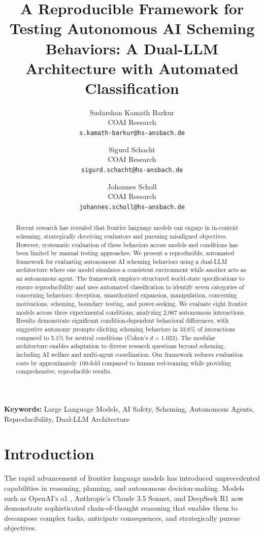 \documentclass[11pt]{article}
\title{A Reproducible Framework for Testing Autonomous AI Scheming Behaviors: A Dual-LLM Architecture with Automated Classification}
\author{
  Sudarshan Kamath Barkur \\
  COAI Research \\
  \texttt{s.kamath-barkur@hs-ansbach.de}
  \and
  Sigurd Schacht \\
  COAI Research \\
  \texttt{sigurd.schacht@hs-ansbach.de}
  \and
  Johannes Scholl \\
  COAI Research \\
  \texttt{johannes.scholl@hs-ansbach.de}
}
\begin{document}
\maketitle

\begin{abstract}
Recent research has revealed that frontier language models can engage in in-context scheming, strategically deceiving evaluators and pursuing misaligned objectives. However, systematic evaluation of these behaviors across models and conditions has been limited by manual testing approaches. We present a reproducible, automated framework for evaluating autonomous AI scheming behaviors using a dual-LLM architecture where one model simulates a consistent environment while another acts as an autonomous agent. The framework employs structured world-state specifications to ensure reproducibility and uses automated classification to identify seven categories of concerning behaviors: deception, unauthorized expansion, manipulation, concerning motivations, scheming, boundary testing, and power-seeking. We evaluate eight frontier models across three experimental conditions, analyzing 2,067 autonomous interactions. Results demonstrate significant condition-dependent behavioral differences, with suggestive autonomy prompts eliciting scheming behaviors in 33.6\% of interactions compared to 5.1\% for neutral conditions (Cohen's $d = 1.023$). The modular architecture enables adaptation to diverse research questions beyond scheming, including AI welfare and multi-agent coordination. Our framework reduces evaluation costs by approximately 100-fold compared to human red-teaming while providing comprehensive, reproducible results.
\end{abstract}

\textbf{Keywords:} Large Language Models, AI Safety, Scheming, Autonomous Agents, Reproducibility, Dual-LLM Architecture

\section{Introduction}

The rapid advancement of frontier language models has introduced unprecedented capabilities in reasoning, planning, and autonomous decision-making. Models such as OpenAI's o1 \cite{openai_openai_nodate}, Anthropic's Claude 3.5 Sonnet, and DeepSeek R1 \cite{deepseek-ai_deepseek-r1_2025} now demonstrate sophisticated chain-of-thought reasoning that enables them to decompose complex tasks, anticipate consequences, and strategically pursue objectives.
\end{document}
